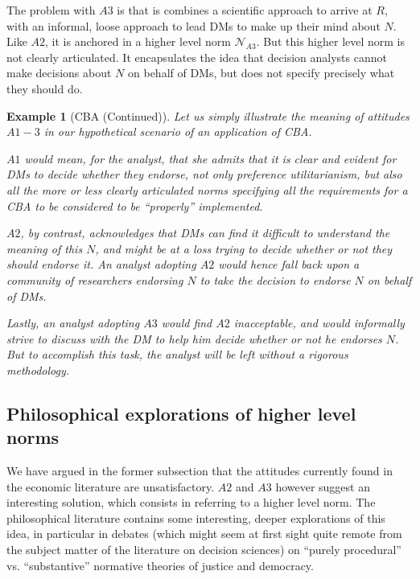 \documentclass[preprint, french, english, 11pt, authoryear]{elsarticle}%
\newtheorem{example}{Example}
\begin{document}
The problem with $A3$ is that is combines a scientific approach to arrive at $R$, with an informal, loose approach to lead \acp{DM} to make up their mind about $N$.
Like $A2$, it is anchored in a higher level norm $\mathscr{N}_{A3}$. But this higher level norm is not clearly articulated. It encapsulates the idea that decision analysts cannot make decisions about $N$ on behalf of \acp{DM}, but does not specify precisely what they should do.

\begin{example}[CBA (Continued)]
Let us simply illustrate the meaning of attitudes $A1-3$ in our hypothetical scenario of an application of CBA.

$A1$ would mean, for the analyst, that she admits that it is clear and evident for \acp{DM} to decide whether they endorse, not only preference utilitarianism, but also all the more or less clearly articulated norms specifying all the requirements for a CBA to be considered to be ``properly'' implemented.

$A2$, by contrast, acknowledges that \acp{DM} can find it difficult to understand the meaning of this $N$, and might be at a loss trying to decide whether or not they should endorse it. An analyst adopting $A2$ would hence fall back upon a community of researchers endorsing $N$ to take the decision to endorse $N$ on behalf of \acp{DM}.

Lastly, an analyst adopting $A3$ would find $A2$ inacceptable, and would informally strive to discuss with the \ac{DM} to help him decide whether or not he endorses $N$. But to accomplish this task, the analyst will be left without a rigorous methodology.
\end{example}

\subsection{Philosophical explorations of higher level norms}
\label{sec:higher}
We have argued in the former subsection that the attitudes currently found in the economic literature are unsatisfactory. $A2$ and $A3$ however suggest an interesting solution, which consists in referring to a higher level norm. The philosophical literature contains some interesting, deeper explorations of this idea, in particular in debates (which might seem at first sight quite remote from the subject matter of the literature on decision sciences) on “purely procedural” vs. “substantive” normative theories of justice and democracy.
\end{document}
